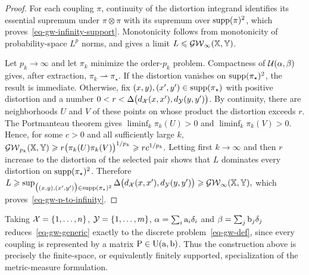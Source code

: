 \begin{proof}
For each coupling $\pi$, continuity of the distortion integrand identifies its essential supremum under $\pi\otimes\pi$ with its supremum over $\operatorname{supp}(\pi)^2$, which proves~\eqref{eq-gw-infinity-support}. Monotonicity follows from monotonicity of probability-space $L^p$ norms, and gives a limit $L\leqslant\operatorname{\mathcal{GW}}_\infty(\mathbb{X},\mathbb{Y})$.

Let $p_k\to\infty$ and let $\pi_k$ minimize the order-$p_k$ problem. Compactness of $\mathcal{U}(\alpha,\beta)$ gives, after extraction, $\pi_k\rightharpoonup\pi_\star$. If the distortion vanishes on $\operatorname{supp}(\pi_\star)^2$, the result is immediate. Otherwise, fix $(x,y),(x',y')\in\operatorname{supp}(\pi_\star)$ with positive distortion and a number
$0<r<\Delta\bigl(d_{\mathcal{X}}(x,x'),d_{\mathcal{Y}}(y,y')\bigr)$.
By continuity, there are neighborhoods $U$ and $V$ of these points on whose product the distortion exceeds $r$. The Portmanteau theorem gives $\liminf_k\pi_k(U)>0$ and $\liminf_k\pi_k(V)>0$. Hence, for some $c>0$ and all sufficiently large $k$,
\(\operatorname{\mathcal{GW}}_{p_k}(\mathbb{X},\mathbb{Y}) \geqslant r\bigl(\pi_k(U)\pi_k(V)\bigr)^{1/p_k} \geqslant rc^{1/p_k}.\)
Letting first $k\to\infty$ and then $r$ increase to the distortion of the selected pair shows that $L$ dominates every distortion on $\operatorname{supp}(\pi_\star)^2$. Therefore
\(L \geqslant \sup_{\bigl((x,y),(x',y')\bigr)\in\operatorname{supp}(\pi_\star)^2} \Delta\bigl(d_{\mathcal{X}}(x,x'),d_{\mathcal{Y}}(y,y')\bigr) \geqslant \operatorname{\mathcal{GW}}_\infty(\mathbb{X},\mathbb{Y}),\)
which proves~\eqref{eq-gw-p-to-infinity}.
\end{proof}
Taking $\mathcal{X}=\{1,\ldots,n\}$, $\mathcal{Y}=\{1,\ldots,m\}$, $\alpha=\sum_i \mathrm{a}_i\delta_i$ and $\beta=\sum_j \mathrm{b}_j\delta_j$ reduces~\eqref{eq-gw-generic} exactly to the discrete problem~\eqref{eq-gw-def}, since every coupling is represented by a matrix $\mathrm{P}\in\mathrm{U}(\mathrm{a},\mathrm{b})$. Thus the construction above is precisely the finite-space, or equivalently finitely supported, specialization of the metric-measure formulation.

